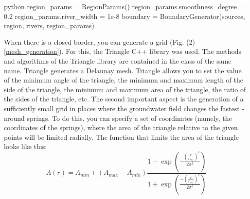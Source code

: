 \documentclass[]{pracamgr}
\begin{document}
      \begin{mintedbox}{python}
        region_params = RegionParams()
        region_params.smoothness_degree = 0.2
        region_params.river_width = 1e-8
        boundary = BoundaryGenerator(sources, region, rivers, region_params)\end{mintedbox}

      When there is a closed border, you can generate a grid (Fig. (2) \ref{mesh_generation}). For this, the Triangle C++ library \cite{szewczuk1996triangle} was used. The methods and algorithms of the Triangle library are contained in the class of the same name. Triangle generates a Delaunay mesh. Triangle allows you to set the value of the minimum angle of the triangle, the minimum and maximum length of the side of the triangle, the minimum and maximum area of the triangle, the ratio of the sides of the triangle, etc. The second important aspect is the generation of a sufficiently small grid in places where the groundwater field changes the fastest - around springs. To do this, you can specify a set of coordinates (namely, the coordinates of the springs), where the area of the triangle relative to the given points will be limited radially. The function that limits the area of the triangle looks like this:
      \begin{equation}
        A(r) = A_{min} + (A_{max} - A_{min}) \frac{1 - \exp{(\frac{-(\frac{r}{r_{ref}})^{e}}{2 \sigma^2})}}{1 + \exp{(\frac{-(\frac{r}{r_{ref}})^{e}}{2 \sigma^2})}} 
        \label{mesh_ref_formula}
      \end{equation}
\end{document}
